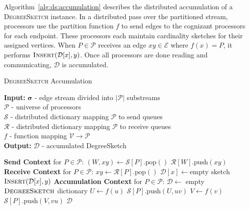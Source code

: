 \documentclass[10]{article}
\newcommand{\push}[1]{\text{push} \left ( #1 \right )}
\newcommand{\pop}{\text{pop}()}
\newcommand{\algoname}[1]{\textnormal{\textsc{#1}}}
\begin{document}
Algorithm~\ref{alg:ds:accumulation} describes the distributed accumulation of a \algoname{DegreeSketch} instance.
In a distributed pass over the partitioned stream, processors use the partition function $f$ to send edges to the cognizant processors for each endpoint. 
These processors each maintain cardinality sketches for their assigned vertices.
When $P \in \mathcal{P}$ receives an edge $xy \in \mathcal{E}$ where $f(x) = P$, it performs $\algoname{Insert}(\mathcal{D}[x], y)$.
Once all processors are done reading and communicating, $\mathcal{D}$ is accumulated.

\begin{algorithm}[htbp] 
\caption{\algoname{DegreeSketch} Accumulation}\label{alg:ds:accumulation}
\begin{flushleft}
        \textbf{Input:} 		$\boldsymbol{\sigma}$ - edge stream divided into $|\mathcal{P}|$ substreams\\
        	\hspace{3.2em}	$\mathcal{P}$ - universe of processors	 \\
        	\hspace{3.2em}	$\mathcal{S}$ - distributed dictionary mapping $\mathcal{P}$ to send queues	 \\
        	\hspace{3.2em}	$\mathcal{R}$ - distributed dictionary mapping $\mathcal{P}$ to receive queues	 \\
        	\hspace{3.2em}	$f$ - function mapping $\mathcal{V} \rightarrow \mathcal{P}$	 \\
        \textbf{Output:} $\mathcal{D}$ - accumulated DegreeSketch
\end{flushleft}
\begin{flushleft}
\begin{algorithmic}[1]
	\Statex \textbf{Send Context} for $P \in \mathcal{P}$:
  			\State $(W, xy) \gets \mathcal{S}[P].\pop$
			\State $\mathcal{R}[W].\push{xy}$
  		\EndWhile
	\Statex \textbf{Receive Context} for $P \in \mathcal{P}$:
  			\State $xy \gets \mathcal{R}[P].\pop$
				\State $\mathcal{D}[x] \gets \text{empty sketch}$
			\EndIf
	  		\State $\algoname{Insert}(\mathcal{D}[x], y)$
  		\EndWhile
	\Statex \textbf{Accumulation Context} for $P \in \mathcal{P}$:
		\State $\mathcal{D} \gets $ empty $\algoname{DegreeSketch}$ dictionary
			\State $U \gets f(u)$
 			\State $\mathcal{S}[P].\push{U, uv}$
			\State $V \gets f(v)$
 			\State $\mathcal{S}[P].\push{V, vu}$
		\EndWhile
		\State \Return $\mathcal{D}$
\end{algorithmic}
\end{flushleft}
\end{algorithm}
\end{document}
